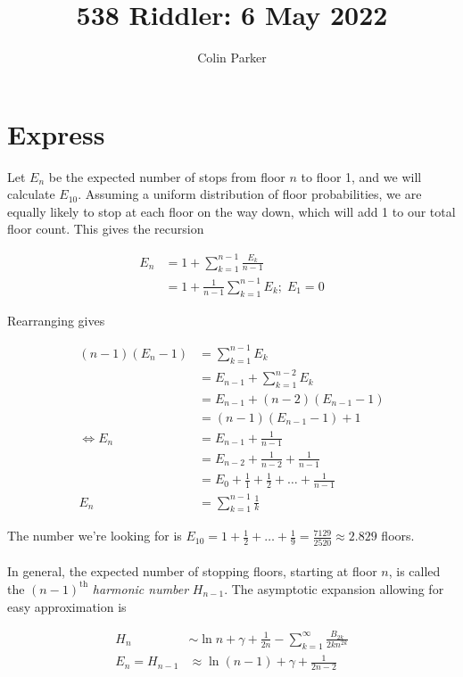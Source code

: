 \documentclass[11pt]{article} %
\title{538 Riddler: 6 May 2022}
\author{Colin Parker}
\begin{document}
\maketitle

\section{Express}
Let $E_n$ be the expected number of stops from floor $n$ to floor 1, and we will calculate $E_{10}$.
Assuming a uniform distribution of floor probabilities, we are equally likely to stop at each floor on the way
down, which will add 1 to our total floor count. This gives the recursion

\begin{align*}
E_n & = 1 + \sum_{k=1}^{n-1} \frac{E_k}{n-1} \\
& = 1 + \frac{1}{n-1}\sum_{k=1}^{n-1} E_k; \; E_1 = 0
\end{align*}

Rearranging gives

\begin{align*}
(n-1)(E_n - 1) & = \sum_{k=1}^{n-1} E_k \\
& = E_{n-1} + \sum_{k=1}^{n-2} E_k \\
& = E_{n-1} + (n-2)(E_{n-1} - 1) \\
& = (n-1)(E_{n-1} - 1) + 1 \\
\iff E_n & = E_{n-1} + \frac{1}{n-1} \\
& = E_{n-2} + \frac{1}{n-2} + \frac{1}{n-1} \\
& = E_0 + \frac{1}{1} + \frac{1}{2} + \ldots + \frac{1}{n-1} \\
E_n & = \sum_{k=1}^{n-1}\frac{1}{k}
\end{align*}

The number we're looking for is $E_{10} = 1 + \frac{1}{2} + \ldots + \frac{1}{9} = \frac{7129}{2520} \approx 2.829$ floors. \\
\\

In general, the expected number of stopping floors, starting at floor $n$, is called the $(n-1)^{\text{th}}$
\emph{harmonic number} $H_{n-1}$. The asymptotic expansion allowing for easy approximation is

\begin{align*}
H_n & \sim \ln n + \gamma + \frac{1}{2n} - \sum_{k=1}^{\infty} \frac{B_{2k}}{2kn^{2k}} \\
E_n = H_{n-1} & \approx \ln (n-1) + \gamma + \frac{1}{2n - 2}
\end{align*}
\end{document}
